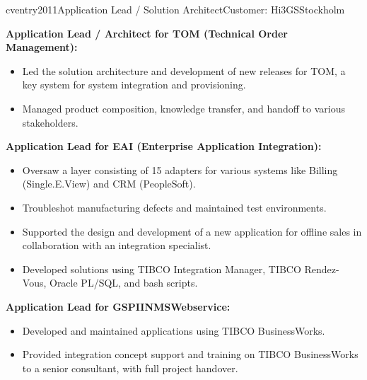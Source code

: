 \documentclass[11pt,a4paper,sans]{moderncv}
\begin{document}
cventry{2011}{Application Lead / Solution Architect}{Customer: Hi3GS}{Stockholm}{}{}
{
    \textbf{Application Lead / Architect for TOM (Technical Order Management):}
    \begin{itemize}
        \item Led the solution architecture and development of new releases for TOM, a key system for system integration and provisioning.
        \item Managed product composition, knowledge transfer, and handoff to various stakeholders.
    \end{itemize}

    \textbf{Application Lead for EAI (Enterprise Application Integration):}
    \begin{itemize}
        \item Oversaw a layer consisting of 15 adapters for various systems like Billing (Single.E.View) and CRM (PeopleSoft).
        \item Troubleshot manufacturing defects and maintained test environments.
        \item Supported the design and development of a new application for offline sales in collaboration with an integration specialist.
        \item Developed solutions using TIBCO Integration Manager, TIBCO Rendez-Vous, Oracle PL/SQL, and bash scripts.
    \end{itemize}

    \textbf{Application Lead for GSPIINMSWebservice:}
    \begin{itemize}
        \item Developed and maintained applications using TIBCO BusinessWorks.
        \item Provided integration concept support and training on TIBCO BusinessWorks to a senior consultant, with full project handover.
    \end{itemize}
}
\end{document}
